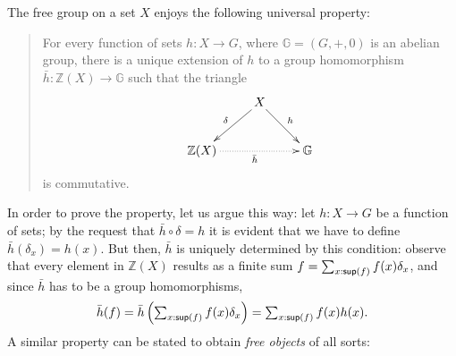\documentclass[11pt]{article}
\begin{document}
The free group on a set $X$ enjoys the following universal property:
\begin{quote}
  For every function of sets $h : X \to G$, where $\mathbb G = (G,+,0)$ is an abelian group, there is a unique extension of $h$ to a group homomorphism $\bar h : \mathbb Z(X) \to \mathbb G$ such that the triangle
\[\vcenter{\xymatrix{
&X\ar[dr]^h\ar[dl]_\delta &\\
\mathbb Z(X) \ar@{.>}[rr]_{\bar h}&& \mathbb G
}}\]
is commutative.
\end{quote}
In order to prove the property, let us argue this way: let $h : X \to G$ be a function of sets; by the request that $\bar h \circ\delta=h$ it is evident that we have to define $\bar h(\delta_x) = h(x)$. But then, $\bar h$ is uniquely determined by this condition: observe that every element in $\mathbb Z(X)$ results as a finite sum $f = \sum_{x : {\sf sup}(f)} f(x)\delta_x$, and since $\bar h$ has to be a group homomorphisms,
\[\textstyle
\bar h(f) = \bar h\left( \sum_{x : {\sf sup}(f)} f(x)\delta_x\right)	= \sum_{x : {\sf sup}(f)} f(x)h(x).
\]
A similar property can be stated to obtain \emph{free objects} of all sorts:
\end{document}
